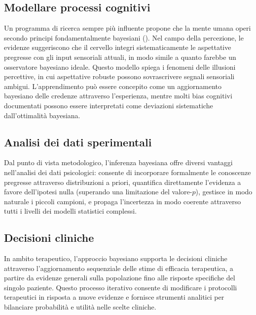 \documentclass[
  letterpaper,
  DIV=11,
  numbers=noendperiod,
  oneside]{scrreprt}
\theoremstyle{definition}
\theoremstyle{plain}
\theoremstyle{definition}
\theoremstyle{remark}
\begin{document}
\subsection{Modellare processi
cognitivi}\label{modellare-processi-cognitivi}

Un programma di ricerca sempre più influente propone che la mente umana
operi secondo principi fondamentalmente bayesiani
(). Nel
campo della percezione, le evidenze suggeriscono che il cervello integri
sistematicamente le aspettative pregresse con gli input sensoriali
attuali, in modo simile a quanto farebbe un osservatore bayesiano
ideale. Questo modello spiega i fenomeni delle illusioni percettive, in
cui aspettative robuste possono sovrascrivere segnali sensoriali
ambigui. L'apprendimento può essere concepito come un aggiornamento
bayesiano delle credenze attraverso l'esperienza, mentre molti bias
cognitivi documentati possono essere interpretati come deviazioni
sistematiche dall'ottimalità bayesiana.

\subsection{Analisi dei dati
sperimentali}\label{analisi-dei-dati-sperimentali}

Dal punto di vista metodologico, l'inferenza bayesiana offre diversi
vantaggi nell'analisi dei dati psicologici: consente di incorporare
formalmente le conoscenze pregresse attraverso distribuzioni a priori,
quantifica direttamente l'evidenza a favore dell'ipotesi nulla
(superando una limitazione del valore-\(p\)), gestisce in modo naturale
i piccoli campioni, e propaga l'incertezza in modo coerente attraverso
tutti i livelli dei modelli statistici complessi.

\subsection{Decisioni cliniche}\label{decisioni-cliniche}

In ambito terapeutico, l'approccio bayesiano supporta le decisioni
cliniche attraverso l'aggiornamento sequenziale delle stime di efficacia
terapeutica, a partire da evidenze generali sulla popolazione fino alle
risposte specifiche del singolo paziente. Questo processo iterativo
consente di modificare i protocolli terapeutici in risposta a nuove
evidenze e fornisce strumenti analitici per bilanciare probabilità e
utilità nelle scelte cliniche.
\end{document}
